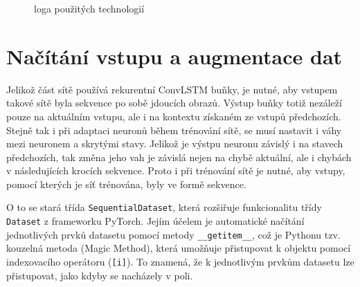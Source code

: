 \begin{figure}[h!]
	\centering
	\hspace{0.2\textwidth}
	\caption{loga použitých technologií}
	\label{fig:logos}
\end{figure}

\section{Načítání vstupu a augmentace dat}
Jelikož část sítě používá rekurentní ConvLSTM buňky, je nutné, aby vstupem takové sítě byla sekvence po sobě jdoucích obrazů.
Výstup buňky totiž nezáleží pouze na aktuálním vstupu, ale i na kontextu získaném ze vstupů předchozích.
Stejně tak i při adaptaci neuronů během trénování sítě, se musí nastavit i váhy mezi neuronem a skrytými stavy.
Jelikož je výstpu neuronu závislý i na stavech předchozích, tak změna jeho vah je závislá nejen na chybě aktuální, ale i chybách v následujících krocích sekvence.
Proto i při trénování sítě je nutné, aby vstupy, pomocí kterých je síť trénována, byly ve formě sekvence.

O to se stará třída \texttt{SequentialDataset}, která rozšiřuje funkcionalitu třídy \texttt{Dataset} z frameworku PyTorch.
Jejím účelem je automatické načítání jednotlivých prvků datasetu pomocí metody \texttt{\_\_getitem\_\_}, což je Pythonu tzv. kouzelná metoda (Magic Method), která umožňuje přistupovat k objektu pomocí indexovacího operátoru (\texttt{[i]}).
To znamená, že k jednotlivým prvkům datasetu lze přistupovat, jako kdyby se nacházely v poli.

